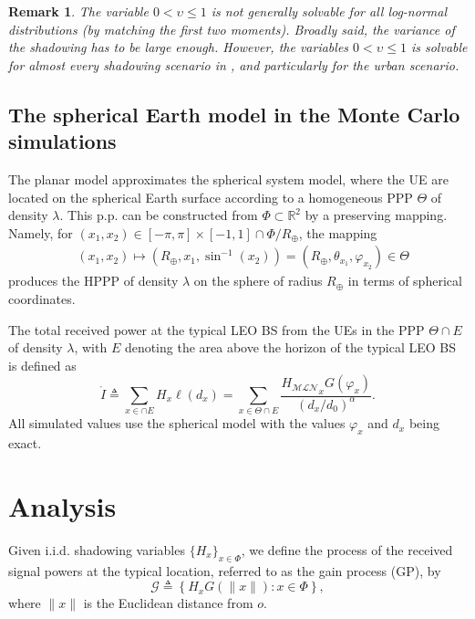 \documentclass[lettersize,journal]{IEEEtran}
\newcommand{\rEarth}{R_{\oplus}}
\newcommand{\R}{\mathbb{R}}
\newtheorem*{remark}{Remark}
\begin{document}
\begin{remark}
  The variable $0 < \upsilon \leq 1$ is not generally solvable for all log-normal distributions (by matching the first two moments). Broadly said, the variance of the shadowing has to be large enough. However, the variables $0<\upsilon \leq 1$ is solvable for almost every shadowing scenario in \cite{TR38.811}, and particularly for the urban scenario.
\end{remark}

\subsection{The spherical Earth model in the Monte Carlo simulations }

\label{sec:sphericalmodel}
The planar model approximates the spherical system model, where the UE are located on the spherical Earth surface according to a homogeneous PPP $\Theta$ of density $\lambda$. This p.p. can be constructed from $\Phi \subset \R^2$ by a preserving mapping. Namely, for $(x_1,x_2) \in [-\pi,\pi]\times[-1,1]\cap\Phi/\rEarth$, the mapping 
\begin{align}
  &(x_1,x_2)\mapsto (\rEarth,x_1,\sin^{-1}(x_2))=(\rEarth,\theta_{x_1},\varphi_{x_2}) \in \Theta
\end{align}
 produces the HPPP of density $\lambda$ on the sphere of radius $\rEarth$ in terms of spherical coordinates.

The total received power at the typical LEO BS from the UEs in the PPP $\Theta \cap E $ of density $\lambda$, with $E$ denoting the area above the horizon of the typical LEO BS is defined as
\begin{equation}
  \label{eq:mathringptot}
  \mathring{I} \triangleq  \sum_{x \in \cap E } H_x\ell(d_x) = \sum_{x \in \Theta \cap E }  \frac{{H_{\mathcal{M}\mathcal{L}\mathcal{N}}}_x G(\varphi_x)}{(d_x/d_0)^{\alpha}}.
\end{equation}
All simulated values use the spherical model with the values $\varphi_x$ and $d_x$ being exact.

\section{Analysis}

         
Given i.i.d. shadowing variables $\{H_x\}_{x \in \Phi}$, we define the process of the received signal powers at the typical location, referred to as the gain process (GP), by
\begin{equation}
  \label{eq:gainprocess}
  \mathcal{G} \triangleq \left\{ H_x G(\|x\|) : x \in \Phi \right\},
\end{equation}
where $\|x\|$ is the Euclidean distance from $\textit{o}$. 
\end{document}
